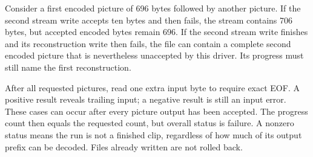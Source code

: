 Consider a first encoded picture of 696 bytes followed by another picture. If
the second stream write accepts ten bytes and then fails, the stream contains
706 bytes, but accepted encoded bytes remain 696. If the second stream write
finishes and its reconstruction write then fails, the file can contain a complete
second encoded picture that is nevertheless unaccepted by this driver. Its
progress must still name the first reconstruction.

After all requested pictures, read one extra input byte to require exact EOF.
A positive result reveals trailing input; a negative result is still an input
error. These cases can occur after every picture output has been accepted.
The progress count then equals the requested count, but overall status is failure.
A nonzero status means the run is not a finished clip, regardless of how much of
its output prefix can be decoded. Files already written are not rolled back.


